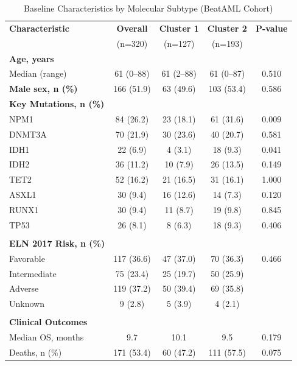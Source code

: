 \documentclass[11pt,a4paper]{article}
\begin{document}
\begin{table}[H]
\centering
\caption{Baseline Characteristics by Molecular Subtype (BeatAML Cohort)}
\label{tab:characteristics}
\small
\begin{tabular}{l c c c c}
\toprule
\textbf{Characteristic} & \textbf{Overall} & \textbf{Cluster 1} & \textbf{Cluster 2} & \textbf{P-value} \\
 & (n=320) & (n=127) & (n=193) & \\
\midrule
\textbf{Age, years} & & & & \\
\quad Median (range) & 61 (0--88) & 61 (2--88) & 61 (0--87) & 0.510 \\
\textbf{Male sex, n (\%)} & 166 (51.9) & 63 (49.6) & 103 (53.4) & 0.586 \\
\textbf{Key Mutations, n (\%)} & & & & \\
\quad NPM1 & 84 (26.2) & 23 (18.1) & 61 (31.6) & 0.009 \\
\quad DNMT3A & 70 (21.9) & 30 (23.6) & 40 (20.7) & 0.581 \\
\quad IDH1 & 22 (6.9) & 4 (3.1) & 18 (9.3) & 0.041 \\
\quad IDH2 & 36 (11.2) & 10 (7.9) & 26 (13.5) & 0.149 \\
\quad TET2 & 52 (16.2) & 21 (16.5) & 31 (16.1) & 1.000 \\
\quad ASXL1 & 30 (9.4) & 16 (12.6) & 14 (7.3) & 0.120 \\
\quad RUNX1 & 30 (9.4) & 11 (8.7) & 19 (9.8) & 0.845 \\
\quad TP53 & 26 (8.1) & 8 (6.3) & 18 (9.3) & 0.406 \\
 & & & & \\
\textbf{ELN 2017 Risk, n (\%)} & & & & \\
\quad Favorable & 117 (36.6) & 47 (37.0) & 70 (36.3) & 0.466 \\
\quad Intermediate & 75 (23.4) & 25 (19.7) & 50 (25.9) & \\
\quad Adverse & 119 (37.2) & 50 (39.4) & 69 (35.8) & \\
\quad Unknown & 9 (2.8) & 5 (3.9) & 4 (2.1) & \\
 & & & & \\
\textbf{Clinical Outcomes} & & & & \\
\quad Median OS, months & 9.7 & 10.1 & 9.5 & 0.179 \\
\quad Deaths, n (\%) & 171 (53.4) & 60 (47.2) & 111 (57.5) & 0.075 \\
\bottomrule
\end{tabular}
\end{table}
\end{document}
